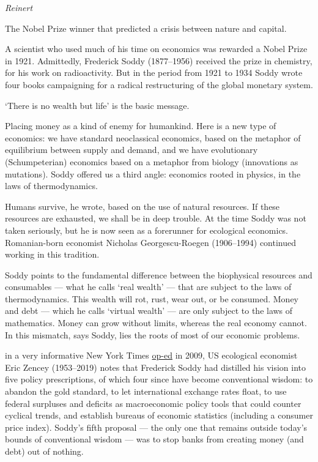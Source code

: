 \documentclass[
]{book}
\begin{document}
\emph{Reinert}

The Nobel Prize winner that predicted a crisis between nature and capital.

A scientist who used much of his time on economics was rewarded a Nobel Prize in 1921. Admittedly, Frederick Soddy (1877--1956) received the prize in chemistry, for his work on radioactivity. But in the period from 1921 to 1934 Soddy wrote four books campaigning for a radical restructuring of the global monetary system.

`There is no wealth but life' is the basic message.

Placing money as a kind of enemy for humankind. Here is a new type of economics: we have standard neoclassical economics, based on the metaphor of equilibrium between supply and demand, and we have evolutionary (Schumpeterian) economics based on a metaphor from biology (innovations as mutations). Soddy offered us a third angle: economics rooted in physics, in the laws of thermodynamics.

Humans survive, he wrote, based on the use of natural resources. If these resources are exhausted, we shall be in deep trouble. At the time Soddy was not taken seriously, but he is now seen as a forerunner for ecological economics. Romanian-born economist Nicholas Georgescu-Roegen (1906--1994) continued working in this tradition.

Soddy points to the fundamental difference between the biophysical resources and consumables --- what he calls `real wealth' --- that are subject to the laws of thermodynamics. This wealth will rot, rust, wear out, or be consumed. Money and debt --- which he calls `virtual wealth' --- are only subject to the laws of mathematics. Money can grow without limits, whereas the real economy cannot. In this mismatch, says Soddy, lies the roots of most of our economic problems.

in a very informative New York Times \href{https://www.nytimes.com/2009/04/12/opinion/12zencey.html}{op-ed} in 2009, US ecological economist Eric Zencey (1953--2019) notes that Frederick Soddy had distilled his vision into five policy prescriptions, of which four since have become conventional wisdom: to abandon the gold standard, to let international exchange rates float, to use federal surpluses and deficits as macroeconomic policy tools that could counter cyclical trends, and establish bureaus of economic statistics (including a consumer price index). Soddy's fifth proposal --- the only one that remains outside today's bounds of conventional wisdom --- was to stop banks from creating money (and debt) out of nothing.
\end{document}
